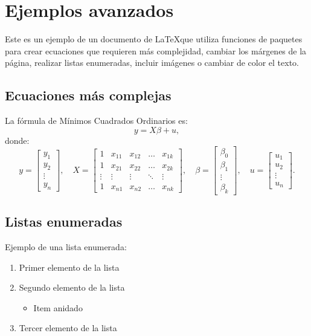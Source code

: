 \documentclass{article}
\begin{document}
\section{Ejemplos avanzados}
Este es un ejemplo de un documento de \LaTeX que utiliza funciones de paquetes para crear ecuaciones que requieren más complejidad, cambiar los márgenes de la página, realizar listas enumeradas, incluir imágenes o cambiar de color el texto.

\subsection{Ecuaciones más complejas}
La fórmula de Mínimos Cuadrados Ordinarios es:
\begin{equation}
    y = X\beta + u,
\end{equation}
donde:
\[
    y =
    \begin{bmatrix}
        y_1 \\
        y_2 \\
        \vdots \\
        y_n
    \end{bmatrix}, \quad
    X =
    \begin{bmatrix}
        1 & x_{11} & x_{12} & \dots & x_{1k} \\
        1 & x_{21} & x_{22} & \dots & x_{2k} \\
        \vdots & \vdots & \vdots & \ddots & \vdots \\
        1 & x_{n1} & x_{n2} & \dots & x_{nk}
    \end{bmatrix}, \quad
    \beta =
    \begin{bmatrix}
        \beta_0 \\
        \beta_1 \\
        \vdots \\
        \beta_k
    \end{bmatrix}, \quad
    u =
    \begin{bmatrix}
        u_1 \\
        u_2 \\
        \vdots \\
        u_n
    \end{bmatrix}.
\]

\subsection{Listas enumeradas}
Ejemplo de una lista enumerada:
\begin{enumerate}
    \item Primer elemento de la lista
    \item Segundo elemento de la lista
    \begin{itemize}
        \item Item anidado
    \end{itemize}
    \item Tercer elemento de la lista
\end{enumerate}
\end{document}
